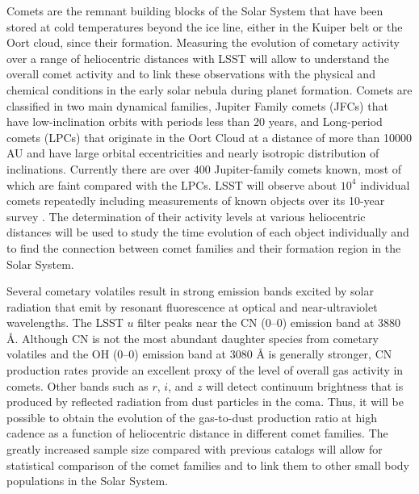 Comets are the remnant building blocks of the Solar System
that have been stored at cold temperatures beyond the ice
line, either in the Kuiper belt or the Oort cloud, since their
formation.  Measuring the evolution of cometary activity over
a range of heliocentric distances with LSST will allow to
understand the overall comet activity and to link these
observations with the physical and chemical conditions in the
early solar nebula during planet formation.  Comets are
classified in two main dynamical families, Jupiter Family
comets (JFCs) that have low-inclination orbits with periods
less than 20 years, and Long-period comets (LPCs) that
originate in the Oort Cloud at a distance of more than 10000
AU and have large orbital eccentricities and nearly isotropic
distribution of inclinations.  Currently there are over 400
Jupiter-family comets known, most of which are faint compared
with the LPCs.  LSST will observe about $10^4$ individual
comets repeatedly including measurements of known objects over
its 10-year survey \citep{2010PhDT.......241S}. The
determination of their activity levels at various heliocentric
distances will be used to study the time evolution of each
object individually and to find the connection between comet
families and their formation region in the Solar System.

Several cometary volatiles result in strong emission bands
excited by solar radiation that emit by resonant fluorescence
at optical and near-ultraviolet wavelengths.  The LSST $u$
filter peaks near the CN (0--0) emission band at 3880 \r{A}.
Although CN is not the most abundant daughter species from
cometary volatiles and the OH (0--0) emission band at 3080
\r{A} is generally stronger, CN production rates provide an
excellent proxy of the level of overall gas activity in
comets. Other bands such as $r$, $i$, and $z$ will detect
continuum brightness that is produced by reflected radiation
from dust particles in the coma. Thus, it will be possible to
obtain the evolution of the gas-to-dust production ratio at
high cadence as a function of heliocentric distance in
different comet families. The greatly increased sample size
compared with previous catalogs \citep{1995Icar..118..223A}
will allow for statistical comparison of the comet families
and to link them to other small body populations in the Solar
System.

%

